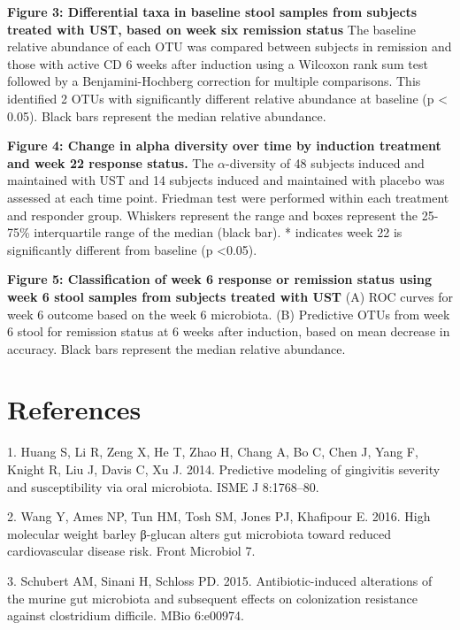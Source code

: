 \documentclass[12pt,]{article}
\begin{document}
\textbf{Figure 3: Differential taxa in baseline stool samples from
subjects treated with UST, based on week six remission status} The
baseline relative abundance of each OTU was compared between subjects in
remission and those with active CD 6 weeks after induction using a
Wilcoxon rank sum test followed by a Benjamini-Hochberg correction for
multiple comparisons. This identified 2 OTUs with significantly
different relative abundance at baseline (p \textless{} 0.05). Black
bars represent the median relative abundance.

\textbf{Figure 4: Change in alpha diversity over time by induction
treatment and week 22 response status.} The \({\alpha}\)-diversity of 48
subjects induced and maintained with UST and 14 subjects induced and
maintained with placebo was assessed at each time point. Friedman test
were performed within each treatment and responder group. Whiskers
represent the range and boxes represent the 25-75\% interquartile range
of the median (black bar). * indicates week 22 is significantly
different from baseline (p \textless{}0.05).

\textbf{Figure 5: Classification of week 6 response or remission status
using week 6 stool samples from subjects treated with UST} (A) ROC
curves for week 6 outcome based on the week 6 microbiota. (B) Predictive
OTUs from week 6 stool for remission status at 6 weeks after induction,
based on mean decrease in accuracy. Black bars represent the median
relative abundance.

\newpage

\section*{References}\label{references}

\hypertarget{refs}{}
\hypertarget{ref-Huang_gingivitis_2014}{}
1. Huang S, Li R, Zeng X, He T, Zhao H, Chang A, Bo C, Chen J, Yang F,
Knight R, Liu J, Davis C, Xu J. 2014. Predictive modeling of gingivitis
severity and susceptibility via oral microbiota. ISME J 8:1768--80.

\hypertarget{ref-Wang_cvdrisk_2016}{}
2. Wang Y, Ames NP, Tun HM, Tosh SM, Jones PJ, Khafipour E. 2016. High
molecular weight barley β-glucan alters gut microbiota toward reduced
cardiovascular disease risk. Front Microbiol 7.

\hypertarget{ref-Schubert_cdiff_2015}{}
3. Schubert AM, Sinani H, Schloss PD. 2015. Antibiotic-induced
alterations of the murine gut microbiota and subsequent effects on
colonization resistance against clostridium difficile. MBio 6:e00974.
\end{document}
